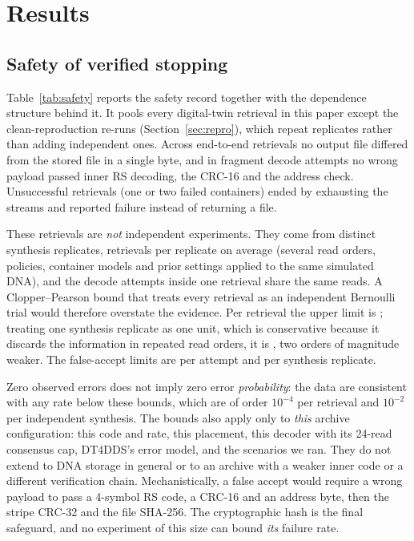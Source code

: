\documentclass[conference,onecolumn,11pt]{IEEEtran}
\begin{document}
\section{Results}\label{sec:results}
\subsection{Safety of verified stopping}

Table~\ref{tab:safety} reports the safety record together with the dependence structure behind it.  It
pools every digital-twin retrieval in this paper except the clean-reproduction re-runs
(Section~\ref{sec:repro}), which repeat replicates rather than adding independent ones.  Across
\SafeN{} end-to-end retrievals no output file differed from the stored file in a single byte, and in
\SafeAtt{} fragment decode attempts no wrong payload passed inner RS decoding, the CRC-16 and the address
check.  Unsuccessful retrievals (one or two failed containers) ended by exhausting the streams and
reported failure instead of returning a file.

These retrievals are \emph{not} independent experiments.  They come from \SafeUnits{} distinct synthesis
replicates, \SafePerUnit{} retrievals per replicate on average (several read orders, policies,
container models and prior settings applied to the same simulated DNA), and the decode attempts inside
one retrieval share the same reads.  A Clopper--Pearson bound that treats every retrieval as an
independent Bernoulli trial would therefore overstate the evidence.  Per retrieval the upper limit is
\SafeWUB{}; treating one synthesis replicate as one unit, which is conservative because it discards the
information in repeated read orders, it is \SafeWUBc{}, two orders of magnitude weaker.  The
false-accept limits are \SafeFUB{} per attempt and \SafeFUBc{} per synthesis replicate.

Zero observed errors does not imply zero error \emph{probability}: the data are consistent with any
rate below these bounds, which are of order $10^{-4}$ per retrieval and $10^{-2}$ per independent
synthesis.  The bounds also apply only to \emph{this} archive configuration: this code and rate, this
placement, this decoder with its 24-read consensus cap, DT4DDS's error model, and the scenarios we ran.
They do not extend to DNA storage in general or to an archive with a weaker inner code or a different
verification chain.  Mechanistically, a false accept would require a wrong payload to pass a 4-symbol RS
code, a CRC-16 and an address byte, then the stripe CRC-32 and the file SHA-256.  The cryptographic hash
is the final safeguard, and no experiment of this size can bound \emph{its} failure rate.
\end{document}
